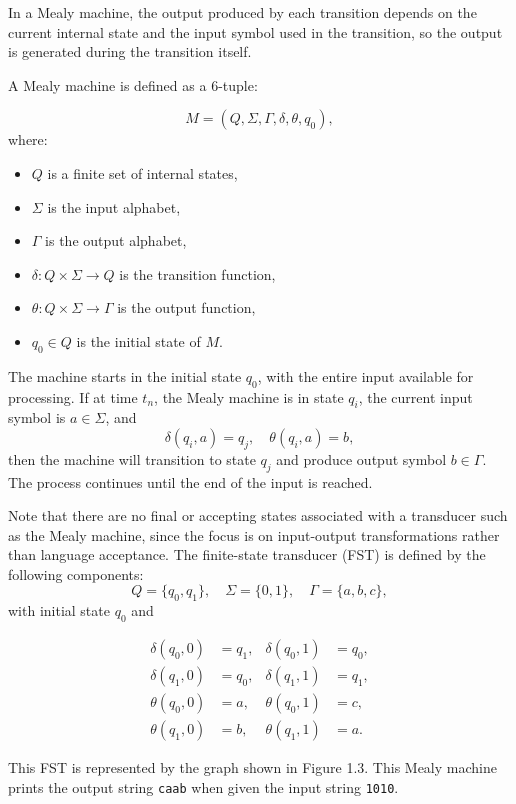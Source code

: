 In a Mealy machine, the output produced by each transition depends on the current internal state and 
the input symbol used in the transition, so the output is generated during the transition itself. 

A Mealy machine is defined as a 6-tuple:

\[
M = (Q, \Sigma, \Gamma, \delta, \theta, q_0),
\]
where:
\begin{itemize}
    \item $Q$ is a finite set of internal states,
    \item $\Sigma$ is the input alphabet,
    \item $\Gamma$ is the output alphabet,
    \item $\delta: Q \times \Sigma \rightarrow Q$ is the transition function,
    \item $\theta: Q \times \Sigma \rightarrow \Gamma$ is the output function,
    \item $q_0 \in Q$ is the initial state of $M$.
\end{itemize}

The machine starts in the initial state $q_0$, with the entire input available for processing. 
If at time $t_n$, the Mealy machine is in state $q_i$, the current input symbol is $a \in \Sigma$, and
\[
\delta(q_i, a) = q_j, \quad \theta(q_i, a) = b,
\]
then the machine will transition to state $q_j$ and produce output symbol $b \in \Gamma$. The process continues until the end of the input is reached.

Note that there are no final or accepting states associated with a transducer such as the Mealy machine, 
since the focus is on input-output transformations rather than language acceptance.
The finite-state transducer (FST) is defined by the following components:
\[
Q = \{q_0, q_1\}, \quad \Sigma = \{0,1\}, \quad \Gamma = \{a, b, c\},
\]
with initial state \( q_0 \) and

\[
\begin{aligned}
\delta(q_0, 0) &= q_1, & \delta(q_0, 1) &= q_0, \\
\delta(q_1, 0) &= q_0, & \delta(q_1, 1) &= q_1, \\
\theta(q_0, 0) &= a, & \theta(q_0, 1) &= c, \\
\theta(q_1, 0) &= b, & \theta(q_1, 1) &= a.
\end{aligned}
\]

This FST is represented by the graph shown in Figure 1.3. 
This Mealy machine prints the output string \texttt{caab} when given the input string \texttt{1010}.

